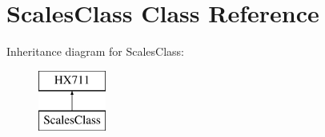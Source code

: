 \hypertarget{class_scales_class}{\section{Scales\-Class Class Reference}
\label{class_scales_class}
}
Inheritance diagram for Scales\-Class\-:\begin{figure}[H]
\begin{center}
\leavevmode
\includegraphics[height=2.000000cm]{class_scales_class}
\end{center}
\end{figure}
